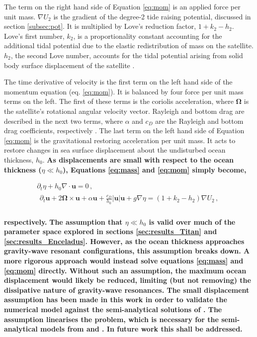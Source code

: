The term on the right hand side of Equation \ref{eq:mom} is an applied force per unit mass. $\nabla U_2$ is the gradient of the degree-2 tide raising potential, discussed in section \ref{subsec:pot}. It is multiplied by Love's reduction factor, $1 + k_2 - h_2$. Love's first number, $k_2$, is a proportionality constant accounting for the additional tidal potential due to the elastic redistribution of mass on the satellite. $h_2$, the second Love number, accounts for the tidal potential arising from solid body surface displacement of the satellite \citep{love1911some}.

The time derivative of velocity is the first term on the left hand side of the momentum equation (eq. \ref{eq:mom}). It is balanced by four force per unit mass terms on the left. The first of these terms is the coriolis acceleration, where $\bm{\Omega}$ is the satellite's rotational angular velocity vector. Rayleigh and bottom drag are described in the next two terms, where $\alpha$ and $c_D$ are the Rayleigh and bottom drag coefficients, respectively \citep{sears1995tidal,chen2013tidal}. The last term on the left hand side of Equation \ref{eq:mom} is the gravitational restoring acceleration per unit mass. It acts to restore changes in sea surface displacement about the undisturbed ocean thickness, $h_0$. \textbf{As displacements are small with respect to the ocean thickness ($\eta \ll h_0$),  Equations \ref{eq:mass} and \ref{eq:mom} simply become,  }

\vspace{-0.5cm}
\begin{gather}
\partial_t \eta + h_0 \nabla \cdot \bm{u} = 0\, , \label{eq:mass_lin}\\
\begin{aligned} 
\partial_t \bm{u} + 2 \bm{\Omega} \times \bm{u} + \alpha\bm{u} + \frac{c_D}{h_0} \left|\bm{u}\right| \bm{u}  + g \nabla \eta = (1 + k_2 - h_2) \nabla U_2 \, , \label{eq:mom_lin}\\
\end{aligned} 
\end{gather}

\noindent \textbf{respectively.} \textbf{The assumption that $\eta \ll h_0$ is valid over much of the parameter space explored in sections \ref{sec:results_Titan} and \ref{sec:results_Enceladus}. However, as the ocean thickness approaches gravity-wave resonant configurations, this assumption breaks down. A more rigorous approach would instead solve equations \ref{eq:mass} and \ref{eq:mom} directly. Without such an assumption, the maximum ocean displacement would likely be reduced, limiting (but not removing) the dissipative nature of gravity-wave resonances. The small displacement assumption has been made in this work in order to validate the numerical model against the semi-analytical solutions of \citet{matsuyama2014tidal}. The assumption linearises the problem, which is necessary for the semi-analytical models from \citet{tyler2011tidal} and \citet{matsuyama2014tidal}. In future work this shall be addressed.}      

